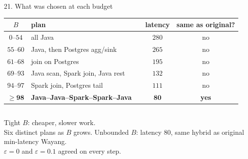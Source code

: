 \documentclass[aspectratio=169,11pt]{beamer}
\begin{document}
\begin{frame}{21. What was chosen at each budget}

\centering
\renewcommand{\arraystretch}{1.25}
\setlength{\tabcolsep}{7pt}
{\small
\begin{tabular}{@{}cllcc@{}}
\toprule
$B$ & plan & & latency & same as original? \\
\midrule
$0$--$54$ & all Java & & $280$ & no \\
$55$--$60$ & Java, then Postgres agg/sink & & $265$ & no \\
$61$--$68$ & join on Postgres & & $195$ & no \\
$69$--$93$ & Java scan, Spark join, Java rest & & $132$ & no \\
$94$--$97$ & Spark join, Postgres tail & & $111$ & no \\
$\mathbf{\ge 98}$ & \textbf{Java--Java--Spark--Spark--Java} & & $\mathbf{80}$ & \textbf{yes} \\
\bottomrule
\end{tabular}}

\vspace{0.45cm}
\begin{columns}[T]
{\small Tight $B$: cheaper, slower work.\\
Six distinct plans as $B$ grows.}
{\small Unbounded $B$: latency $80$, same hybrid as original min-latency Wayang.\\
$\varepsilon=0$ and $\varepsilon=0.1$ agreed on every step.}
\end{columns}
\end{frame}
\end{document}
